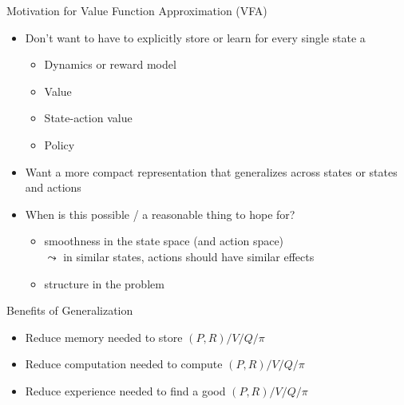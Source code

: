 \documentclass[aspectratio=169]{../latex_main/tntbeamer}  %
\begin{document}
\begin{frame}[c]{Motivation for Value Function Approximation (VFA)}
	
	\begin{itemize}
		\item Don’t want to have to explicitly store or learn for every single state a
		\begin{itemize}
			\item Dynamics or reward model
			\item Value
			\item State-action value
			\item Policy
		\end{itemize}
		\pause
		\item Want a more compact representation that generalizes across states or
		states and actions
		\pause
		\item When is this possible / a reasonable thing to hope for?
		\begin{itemize}
			\item smoothness in the state space (and action space)\\
			$\leadsto$ in similar states, actions should have similar effects 
			\item structure in the problem
		\end{itemize}
	\end{itemize}
	
\end{frame}
\begin{frame}[c]{Benefits of Generalization}
	
	\begin{itemize}
		\item Reduce memory needed to store $(P,R) / V / Q / \pi$
		\item Reduce computation needed to compute $(P,R) / V / Q / \pi$
		\item Reduce experience needed to find a good $(P,R) / V / Q / \pi$
	\end{itemize}
	
\end{frame}
\end{document}
